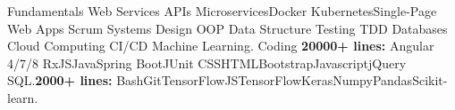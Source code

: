 \vspace{-3mm}
\begin{cvskills}
\vspace{1.5mm}\cvskill
    {Fundamentals}
    {Web Services APIs \skilltypestyle{\textbf{ |}} Microservices\skilltypestyle{\textbf{ | }}Docker \skilltypestyle{\textbf{ | }}Kubernetes\skilltypestyle{\textbf{ | }}Single-Page Web Apps \skilltypestyle{\textbf{|}} Scrum \skilltypestyle{\textbf{ |}}Systems Design\skilltypestyle{\textbf{ |}} OOP \skilltypestyle{\textbf{|}}\newline Data Structure \skilltypestyle{\textbf{ |}} Testing\skilltypestyle{\textbf{ |}} TDD \skilltypestyle{\textbf{ |}} Databases\skilltypestyle{\textbf{ |}} Cloud Computing\skilltypestyle{\textbf{ |}} CI/CD\skilltypestyle{\textbf{ |}} Machine Learning.}
\vspace{1.5mm}\cvskill
     {Coding}
    {\textbf{20000+ lines:} Angular 4/7/8 \skilltypestyle{\textbf{ | }}RxJS\skilltypestyle{\textbf{ | }}Java\skilltypestyle{\textbf{ | }}Spring Boot\skilltypestyle{\textbf{ | }}JUnit \skilltypestyle{\textbf{ | }}CSS\skilltypestyle{\textbf{ | }}HTML\skilltypestyle{\textbf{ | }}Bootstrap\skilltypestyle{\textbf{ | }}Javascript\skilltypestyle{\textbf{ | }}jQuery \skilltypestyle{\textbf{ | }}SQL.\newline \textbf{2000+ lines:} Bash\skilltypestyle{\textbf{ | }}Git\skilltypestyle{\textbf{ | }}TensorFlowJS\skilltypestyle{\textbf{ | }}TensorFlow\skilltypestyle{\textbf{ | }}Keras\skilltypestyle{\textbf{ | }}Numpy\skilltypestyle{\textbf{ | }}Pandas\skilltypestyle{\textbf{ | }}Scikit-learn.  }          
\end{cvskills}
